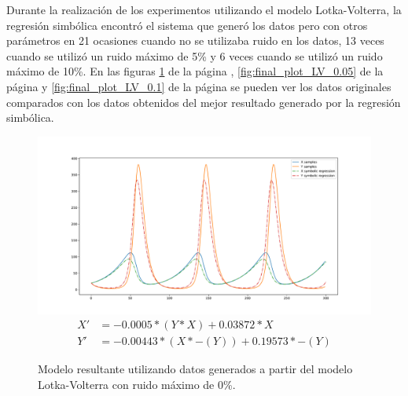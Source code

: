 Durante la realización de los experimentos utilizando el modelo Lotka-Volterra, la regresión simbólica encontró el sistema que generó los datos pero con otros parámetros en 21 ocasiones cuando no se utilizaba ruido en los datos, 13 veces cuando se utilizó un ruido máximo de 5\% y 6 veces cuando se utilizó un ruido máximo de 10\%. En las figuras \ref{fig:final_plot_LV_0.0} de la página \pageref{fig:final_plot_LV_0.0}, \ref{fig:final_plot_LV_0.05} de la página \pageref{fig:final_plot_LV_0.05} y \ref{fig:final_plot_LV_0.1} de la página \pageref{fig:final_plot_LV_0.1} se pueden ver los datos originales comparados con los datos obtenidos del mejor resultado generado por la regresión simbólica.

\begin{figure}[h]
    \centering
    \includegraphics[width=\textwidth]{"figures/final_plot_LV_0.0.pdf"}
    \begin{align*}
        X' & = -0.0005 * (Y * X) + 0.03872 * X        \\
        Y' & = -0.00443 * (X * -(Y)) + 0.19573 * -(Y)
    \end{align*}
    \caption{Modelo resultante utilizando datos generados a partir del modelo Lotka-Volterra con ruido máximo de 0\%.
    }
    \label{fig:final_plot_LV_0.0}
\end{figure}

